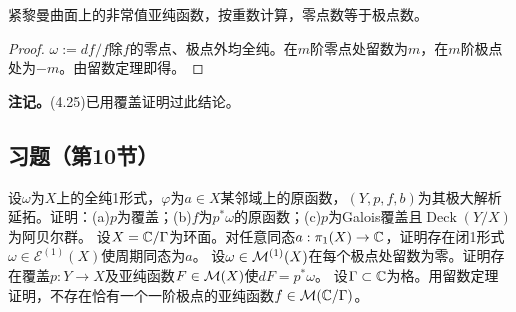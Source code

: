 紧黎曼曲面上的非常值亚纯函数，按重数计算，零点数等于极点数。
\begin{proof}
$\omega:=df/f$除$f$的零点、极点外均全纯。在$m$阶零点处留数为$m$，在$m$阶极点处为$-m$。由留数定理即得。
\end{proof}
\textbf{注记。}(4.25)已用覆盖证明过此结论。
\subsection*{习题（第10节）}
设$\omega$为$X$上的全纯1形式，$\varphi$为$a\in X$某邻域上的原函数，$(Y,p,f,b)$为其极大解析延拓。证明：(a)$p$为覆盖；(b)$f$为$p^*\omega$的原函数；(c)$p$为Galois覆盖且$\operatorname{Deck}(Y/X)$为阿贝尔群。
设$X=\mathbb C/\Gamma$为环面。对任意同态$a:\pi_1(X)\to\mathbb C$，证明存在闭1形式$\omega\in\mathcal E^{(1)}(X)$使周期同态为$a$。
设$\omega\in\mathcal M^{(1)}(X)$在每个极点处留数为零。证明存在覆盖$p:Y\to X$及亚纯函数$F\in\mathcal M(X)$使$dF=p^*\omega$。
设$\Gamma\subset\mathbb C$为格。用留数定理证明，不存在恰有一个一阶极点的亚纯函数$f\in\mathcal M(\mathbb C/\Gamma)$。
